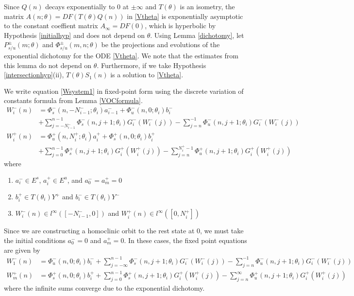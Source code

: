\documentclass[12pt]{article}
\begin{document}
Since $Q(n)$ decays exponentially to 0 at $\pm \infty$ and $T(\theta)$ is an isometry, the matrix $A(n; \theta) = DF(T(\theta) Q(n))$ in \eqref{Vtheta} is exponentially asymptotic to the constant coeffient matrix $A_\infty = DF(0)$, which is hyperbolic by Hypothesis \ref{initialhyp} and does not depend on $\theta$. Using Lemma \ref{dichotomy}, let $P_{s/u}^\pm(m; \theta)$ and $\Phi_{s/u}^\pm(m, n; \theta)$ be the projections and evolutions of the exponential dichotomy for the ODE \ref{Vtheta}. We note that the estimates from this lemma do not depend on $\theta$. Furthermore, if we take Hypothesis \ref{intersectionhyp}(ii), $T(\theta)S_1(n)$ is a solution to \eqref{Vtheta}.

We write equation \eqref{Wsystem1} in fixed-point form using the discrete variation of constants formula from Lemma \ref{VOCformula}.
\begin{equation}\label{FPeqs1}
\begin{aligned}
W_i^-(n) &= 
\Phi_s^-(n, -N_{i-1}^-; \theta_i) a_{i-1}^- + \Phi_u^-(n, 0; \theta_i) b_i^-  \\
&+ \sum_{j = -N_{i-1}^-}^{n-1} \Phi_s^-(n, j+1; \theta_i) G_i^-(W_i^-(j)) - \sum_{j = n}^{-1} \Phi_u^-(n, j+1; \theta_i) G_i^-(W_i^-(j)) \\
W_i^+(n) &= \Phi_u^+(n, N_i^+; \theta_i) a_i^+ + \Phi_s^+(n, 0; \theta_i) b_i^+ \\
&+ \sum_{j = 0}^{n-1} \Phi_s^+(n, j+1; \theta_i) G_i^+(W_i^+(j)) 
- \sum_{j = n}^{N_i^+-1} \Phi_u^+(n, j+1; \theta_i) G_i^+(W_i^+(j))
\end{aligned}
\end{equation}
where 
\begin{enumerate}
\item $a_i^- \in E^s$, $a_i^+ \in E^u$, and $a_0^- = a_m^+ = 0$
\item $b_i^+ \in T(\theta_i) Y^+$ and $b_i^- \in T(\theta_i) Y^-$
\item $W_i^-(n) \in l^\infty([-N_{i-1}^-, 0])$ and $W_i^+(n) \in l^\infty([0, N_i^+])$
\end{enumerate}

Since we are constructing a homoclinic orbit to the rest state at 0, we must take the initial conditions $a_0^- = 0$ and $a_m^+ = 0$. In these cases, the fixed point equations are given by
\begin{align*}
W_1^-(n) &= \Phi_u^-(n, 0; \theta_i) b_i^- 
+ \sum_{j = -\infty}^{n-1} \Phi_s^-(n, j+1; \theta_i) G_i^-(W_i^-(j)) - \sum_{j = n}^{-1} \Phi_u^-(n, j+1; \theta_i) G_i^-(W_i^-(j)) \\
W_m^+(n) &= \Phi_s^+(n, 0; \theta_i) b_i^+ 
+ \sum_{j = 0}^{n-1} \Phi_s^+(n, j+1; \theta_i) G_i^+(W_i^+(j)) 
- \sum_{j = n}^\infty \Phi_u^+(n, j+1; \theta_i) G_i^+(W_i^+(j))
\end{align*}
where the infinite sums converge due to the exponential dichotomy. 
\end{document}

